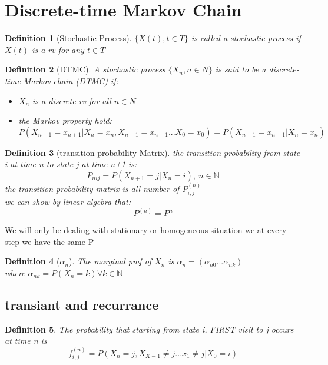 \documentclass[10pt]{article}
\newcommand{\N}{\mathbb{N}}
\theoremstyle{break}
\newtheorem{defn}{Definition}[subsection]
\begin{document}
    \section{Discrete-time Markov Chain}
        \begin{defn}[Stochastic Process]
            $\{X(t),t\in T\}$ is called a stochastic process if $X(t)$ is a rv for any $t\in T$
        \end{defn}
        \begin{defn}[DTMC]
            A stochastic process $\{X_n,n\in N\}$ is said to be a discrete-time Markov chain (DTMC) if:
            \begin{itemize}
                \item $X_n$ is a discrete rv for all $n\in N$
                \item the Markov property hold:
                $$P(X_{n+1}=x_{n+1}|X_n=x_n,X_{n-1}=x_{n-1}...X_0=x_0)=P(X_{n+1}=x_{n+1}|X_n=x_n)$$
            \end{itemize}
        \end{defn}
        \begin{defn}[transition probability Matrix] 
            the transition probability from state i at time n to state j at time n+1 is:
            $$P_{nij}=P(X_{n+1}=j|X_n=i),\ n\in\N$$
            the transition probability matrix is all number of $P^{(n)}_{i,j}$
            \\we can show by linear algebra that:$$P^{(n)}=P^n$$
        \end{defn}
        We will only be dealing with stationary or homogeneous situation we at every step we have the same P
        \begin{defn}[$\alpha_n$]
            The marginal pmf of $X_n$ is $\alpha_n=(\alpha_{n0}...\alpha_{nk})$
            \\where $\alpha_{nk}=P(X_n=k)\forall k\in\N$
        \end{defn}
        \subsection{transiant and recurrance}
            \begin{defn}
                The probability that starting from state i, FIRST visit to j occurs 
                at time n is 
                $$f_{i,j}^{(n)}=P(X_n=j, X_{X-1}\neq j ...x_1 \neq j|X_0=i)$$
            \end{defn}
\end{document}
